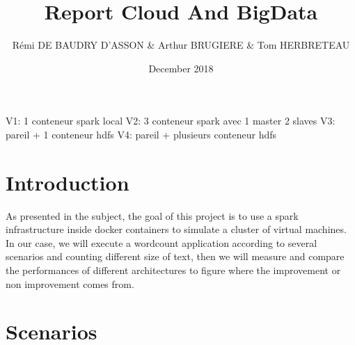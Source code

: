 \documentclass{article}
\title{Report Cloud And BigData}
\author{Rémi DE BAUDRY D'ASSON & Arthur BRUGIERE & Tom HERBRETEAU }
\date{December 2018}
\begin{document}
\maketitle

V1: 1 conteneur spark local
V2: 3 conteneur spark avec 1 master 2 slaves
V3: pareil + 1 conteneur hdfs
V4: pareil + plusieurs conteneur hdfs

\section{Introduction}

As presented in the subject, the goal of this project is to use a spark infrastructure inside docker containers to simulate a cluster of virtual machines. \\

In our case, we will execute a wordcount application according to several scenarios and counting different size of text, then we will measure and compare the performances of different architectures to figure where the improvement or non improvement comes from.

\section{Scenarios}
\end{document}
